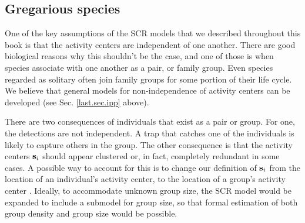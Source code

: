 \begin{table}[ht]

\subsection{Gregarious species}

One of the key assumptions of the SCR models that we described
throughout this book is that the activity centers are independent of
one another.  There are good biological reasons why this shouldn't be
the case, and one of those is when species associate with one another
as a pair, or family group.
 Even species regarded as solitary often join family
groups for some portion of their life cycle.  We believe that general
models for non-independence of activity centers can be developed (see
Sec. \ref{last.sec.ipp} above).

There are two consequences of individuals that exist as a pair or
group. For one, the detections are not independent. A trap that
catches one of the individuals is likely to capture others in the
group.
The other consequence is that the activity centers ${\bf s}_{i}$
should appear clustered or, in fact, completely redundant in some
cases.  A possible way to account for this is to change our definition
of ${\bf s}_i$ from the location of an individual's activity center,
to the location of a group's activity center
\citep{russell_etal:2012}. Ideally, to accommodate unknown group size,
the SCR model would be expanded to include a submodel for group size,
so that formal estimation of both group density and group size would
be possible.





\end{table}
